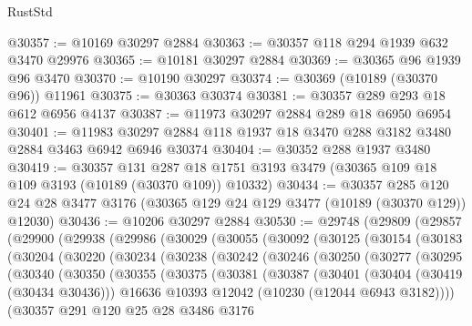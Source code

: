 \begin{lexlean}{RustStd}
\begin{coremodule}
@30357 := @10169 @30297 @2884
@30363 := @30357 @118 @294 @1939 @632 @3470 @29976
@30365 := @10181 @30297 @2884
@30369 := @30365 @96 @1939 @96 @3470
@30370 := @10190 @30297
@30374 := @30369 (@10189 (@30370 @96)) @11961
@30375 := @30363 @30374
@30381 := @30357 @289 @293 @18 @612 @6956 @4137
@30387 := @11973 @30297 @2884 @289 @18 @6950 @6954
@30401 := @11983 @30297 @2884 @118 @1937 @18 @3470 @288 @3182 @3480 @2884 @3463 @6942 @6946 @30374
@30404 := @30352 @288 @1937 @3480
@30419 := @30357
    @131
    @287
    @18
    @1751
    @3193
    @3479
    (@30365 @109 @18 @109 @3193 (@10189 (@30370 @109)) @10332)
@30434 := @30357
    @285
    @120
    @24
    @28
    @3477
    @3176
    (@30365 @129 @24 @129 @3477 (@10189 (@30370 @129)) @12030)
@30436 := @10206 @30297 @2884
@30530 := @29748
    (@29809
      (@29857
        (@29900
          (@29938
            (@29986
              (@30029
                (@30055
                  (@30092
                    (@30125
                      (@30154
                        (@30183
                          (@30204
                            (@30220
                              (@30234
                                (@30238
                                  (@30242
                                    (@30246
                                      (@30250
                                        (@30277
                                          (@30295
                                            (@30340
                                              (@30350
                                                (@30355
                                                  (@30375
                                                    (@30381
                                                      (@30387
                                                        (@30401
                                                          (@30404 (@30419 (@30434 @30436)))
                                                          @16636
                                                          @10393
                                                          @12042
                                                          (@10230 (@12044 @6943 @3182))))
                                                      (@30357
                                                        @291
                                                        @120
                                                        @25
                                                        @28
                                                        @3486
                                                        @3176

\end{coremodule}
\end{lexlean}

